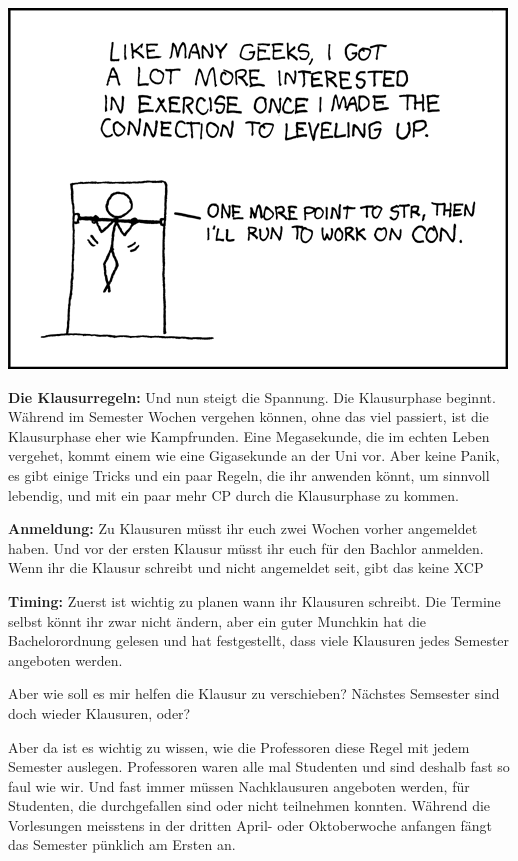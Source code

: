 \begin{center}
\includegraphics[width=\linewidth]{comics/exercise}\\
\end{center}

\textbf{Die Klausurregeln:}
Und nun steigt die Spannung. Die Klausurphase beginnt.
W\"ahrend im Semester Wochen vergehen k\"onnen, ohne das viel passiert, ist die Klausurphase eher wie Kampfrunden.
Eine Megasekunde, die im echten Leben vergehet, kommt einem wie eine Gigasekunde an der Uni vor.
    Aber keine Panik, es gibt einige Tricks und ein paar Regeln, die ihr
anwenden k\"onnt, um sinnvoll lebendig, und mit ein paar mehr CP durch die
Klausurphase zu kommen.

\textbf{Anmeldung:}
Zu Klausuren m\"usst ihr euch zwei Wochen vorher angemeldet haben. Und vor der ersten Klausur m\"usst ihr euch f\"ur den Bachlor anmelden.
Wenn ihr die Klausur schreibt und nicht angemeldet seit, gibt das keine XCP

\textbf{Timing:}
Zuerst ist wichtig zu planen wann ihr Klausuren schreibt.
Die Termine selbst k\"onnt ihr zwar nicht \"andern, aber ein guter Munchkin hat die Bachelorordnung gelesen
und hat festgestellt, dass viele Klausuren jedes Semester angeboten werden.

Aber wie soll es mir helfen die Klausur zu verschieben?
N\"achstes Semsester sind doch wieder Klausuren, oder?

Aber da ist es wichtig
zu wissen, wie die Professoren diese Regel mit jedem Semester auslegen.
Professoren waren alle mal Studenten und sind deshalb fast so faul wie wir.
Und fast immer m\"ussen Nachklausuren angeboten werden, f\"ur Studenten, die durchgefallen sind oder nicht teilnehmen konnten.
W\"ahrend die Vorlesungen meisstens in der dritten April- oder Oktoberwoche anfangen f\"angt das Semester p\"unklich am Ersten an.

